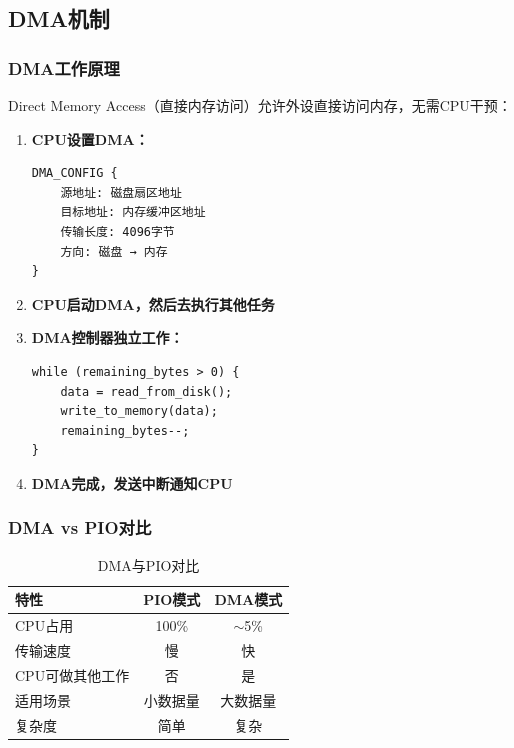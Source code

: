\documentclass[UTF8,a4paper,12pt]{ctexart}
\begin{document}
\subsection{DMA机制}

\subsubsection{DMA工作原理}

Direct Memory Access（直接内存访问）允许外设直接访问内存，无需CPU干预：

\begin{enumerate}[leftmargin=2em]
    \item \textbf{CPU设置DMA：}
    \begin{lstlisting}[style=cstyle]
DMA_CONFIG {
    源地址: 磁盘扇区地址
    目标地址: 内存缓冲区地址
    传输长度: 4096字节
    方向: 磁盘 → 内存
}
    \end{lstlisting}

    \item \textbf{CPU启动DMA，然后去执行其他任务}

    \item \textbf{DMA控制器独立工作：}
    \begin{lstlisting}[style=cstyle]
while (remaining_bytes > 0) {
    data = read_from_disk();
    write_to_memory(data);
    remaining_bytes--;
}
    \end{lstlisting}

    \item \textbf{DMA完成，发送中断通知CPU}
\end{enumerate}

\subsubsection{DMA vs PIO对比}

\begin{table}[H]
\centering
\caption{DMA与PIO对比}
\begin{tabular}{lcc}
\toprule
\textbf{特性} & \textbf{PIO模式} & \textbf{DMA模式} \\
\midrule
CPU占用 & 100\% & $\sim$5\% \\
传输速度 & 慢 & 快 \\
CPU可做其他工作 & 否 & 是 \\
适用场景 & 小数据量 & 大数据量 \\
复杂度 & 简单 & 复杂 \\
\bottomrule
\end{tabular}
\end{table}
\end{document}

